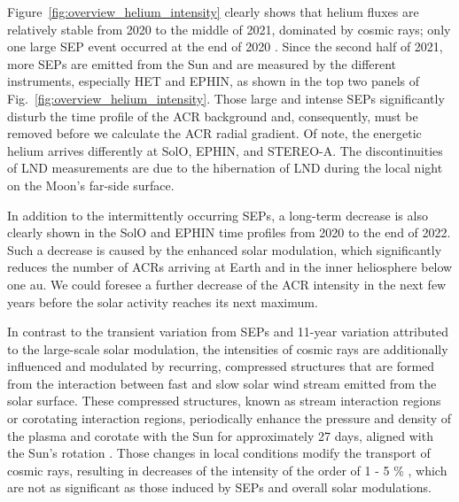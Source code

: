 Figure~\ref{fig:overview_helium_intensity} clearly shows that helium fluxes are relatively stable from 2020 to the middle of 2021, dominated by cosmic rays; only one large \ac{SEP} event occurred at the end of 2020 \citep{Kolhoff2021AA}. 
Since the second half of 2021, more \acp{SEP} are emitted from the Sun and are measured by the different instruments, especially \ac{HET} and \ac{EPHIN}, as shown in the top two panels of Fig.~\ref{fig:overview_helium_intensity}.
Those large and intense \acp{SEP} significantly disturb the time profile of the \ac{ACR} background and, consequently, must be removed before we calculate the \ac{ACR} radial gradient. 
Of note, the energetic helium arrives differently at \ac{SolO}, \ac{EPHIN}, and \ac{STEREO}-A. The discontinuities of \ac{LND} measurements are due to the hibernation of \ac{LND} during the local night on the Moon's far-side surface.


In addition to the intermittently occurring \acp{SEP}, a long-term decrease is also clearly shown in the \ac{SolO} and \ac{EPHIN} time profiles from 2020 to the end of 2022. Such a decrease is caused by the enhanced solar modulation, which significantly reduces the number of \acp{ACR} arriving at Earth and in the inner heliosphere below one au. We could foresee a further decrease of the \ac{ACR} intensity in the next few years before the solar activity reaches its next maximum.

In contrast to the transient variation from \acp{SEP} and 11-year variation attributed to the large-scale solar modulation, the intensities of cosmic rays are additionally influenced and modulated by recurring, compressed structures that are formed from the interaction between fast and slow solar wind stream emitted from the solar surface. These compressed structures, known as stream interaction regions or corotating interaction regions, periodically enhance the pressure and density of the plasma and corotate with the Sun for approximately 27 days, aligned with the Sun's rotation \citep{Burlaga1974JGR, Gosling1976JGR, Richardson2004SSRv}. Those changes in local conditions modify the transport of cosmic rays, resulting in decreases of the intensity of the order of 1 - 5 \% \citep{Richardson2004SSRv, Richardson-2018}, which are not as significant as those induced by \acp{SEP} and overall solar modulations.

